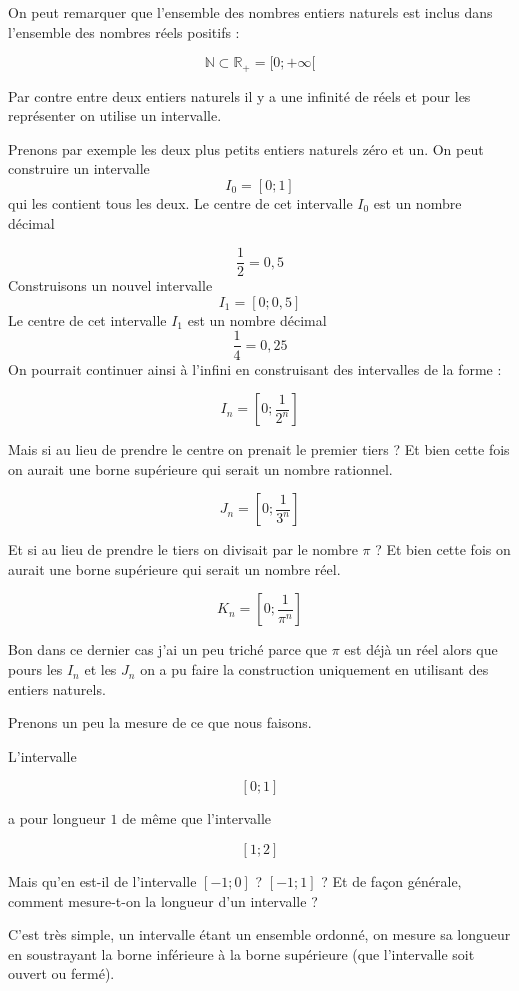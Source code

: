 \documentclass[a4paper,11pt]{book}
\begin{document}
On peut remarquer que l'ensemble des nombres entiers
naturels est inclus dans l'ensemble
des nombres réels positifs :

\[\mathbb{N}\subset \mathbb{R}_{+} = [0; +\infty[\]

Par contre entre deux entiers naturels il y a une infinité de réels et
pour les représenter on utilise un intervalle.

Prenons par exemple les deux plus petits entiers naturels zéro et
un. On peut construire un intervalle
\[I_0 = [0 ; 1]\]
qui les contient tous les deux.
Le centre de cet intervalle \(I_0\) est un nombre
décimal

\[\dfrac{1}{2} = 0,5\]
Construisons un nouvel intervalle
\[I_1 = [0; 0,5]\]
Le centre de cet intervalle \(I_1\) est un nombre décimal
\[\dfrac{1}{4} = 0,25\]
On pourrait continuer ainsi à l'infini en construisant des intervalles
de la forme :

\[I_n = \left[0 ; \dfrac{1}{2^n}\right]\]

Mais si au lieu de prendre le centre on prenait le premier tiers ?
Et bien cette fois on aurait une borne
supérieure qui serait un nombre
rationnel.

\[J_n = \left[0 ; \dfrac{1}{3^n}\right]\]


Et si au lieu de prendre le tiers on divisait par le nombre \(\pi\) ?
Et bien cette fois on aurait une borne supérieure qui
serait un nombre réel.

\[K_n = \left[0 ; \dfrac{1}{\pi^n}\right]\]

Bon dans ce dernier cas j'ai un peu triché parce que \(\pi\) est déjà
un réel alors que pours les \(I_n\) et les \(J_n\) on a pu faire la
construction uniquement en utilisant des entiers naturels.

Prenons un peu la mesure de ce que nous faisons.

L'intervalle

\[[0 ; 1]\]

a pour longueur \(1\) de même que l'intervalle

\[[1 ; 2]\]

Mais qu'en est-il de l'intervalle \([-1 ; 0]\) ? \([-1 ; 1]\) ?
Et de façon générale, comment mesure-t-on la longueur d'un intervalle
?



C'est très simple, un intervalle étant un
ensemble ordonné, on mesure sa longueur en
soustrayant la borne inférieure à la
borne supérieure (que l'intervalle soit ouvert
ou fermé).
\end{document}
